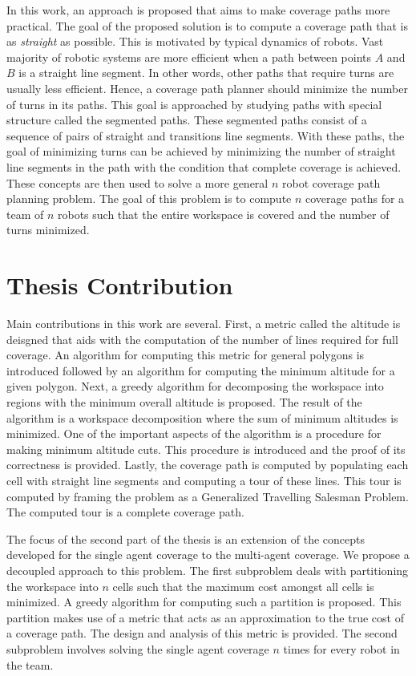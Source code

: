 \documentclass[../main.tex]{subfiles}
\begin{document}
In this work, an approach is proposed that aims to make coverage paths more practical. The goal of the proposed solution is to compute a coverage path that is as \emph{straight} as possible. This is motivated by typical dynamics of robots. Vast majority of robotic systems are more efficient when a path between points $A$ and $B$ is a straight line segment. In other words, other paths that require turns are usually less efficient. Hence, a coverage path planner should minimize the number of turns in its paths. This goal is approached by studying paths with special structure called the segmented paths. These segmented paths consist of a sequence of pairs of straight and transitions line segments. With these paths, the goal of minimizing turns can be achieved by minimizing the number of straight line segments in the path with the condition that complete coverage is achieved. These concepts are then used to solve a more general $n$ robot coverage path planning problem. The goal of this problem is to compute $n$ coverage paths for a team of $n$ robots such that the entire workspace is covered and the number of turns minimized.

\section{Thesis Contribution}
\label{section:thesis_contribution}

Main contributions in this work are several. First, a metric called the altitude is deisgned that aids with the computation of the number of lines required for full coverage. An algorithm for computing this metric for general polygons is introduced followed by an algorithm for computing the minimum altitude for a given polygon. Next, a greedy algorithm for decomposing the workspace into regions with the minimum overall altitude is proposed. The result of the algorithm is a workspace decomposition where the sum of minimum altitudes is minimized. One of the important aspects of the algorithm is a procedure for making minimum altitude cuts. This procedure is introduced and the proof of its correctness is provided. Lastly, the coverage path is computed by populating each cell with straight line segments and computing a tour of these lines. This tour is computed by framing the problem as a Generalized Travelling Salesman Problem. The computed tour is a complete coverage path. 

The focus of the second part of the thesis is an extension of the concepts developed for the single agent coverage to the multi-agent coverage. We propose a decoupled approach to this problem. The first subproblem deals with partitioning the workspace into $n$ cells such that the maximum cost amongst all cells is minimized. A greedy algorithm for computing such a partition is proposed. This partition makes use of a metric that acts as an approximation to the true cost of a coverage path. The design and analysis of this metric is provided. The second subproblem involves solving the single agent coverage $n$ times for every robot in the team.
\end{document}

